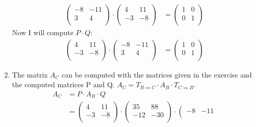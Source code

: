 \documentclass[a4paper]{article}
\begin{document}
\begin{enumerate}
\begin{align*}
  \left(
  \begin{array}{cc}
  -8 & -11 \\
  3 & 4 \\
  \end{array}
  \right)
  \cdot
  \left(
  \begin{array}{cc}
  4 & 11 \\
  -3 & -8 \\
  \end{array}
  \right)
  &=
  \left(
  \begin{array}{cc}
  1 & 0 \\
  0 & 1 \\
  \end{array}
  \right)
  \end{align*}
  Now I will compute $P \cdot Q$:
  \begin{align*}
  \left(
  \begin{array}{cc}
  4 & 11 \\
  -3 & -8 \\
  \end{array}
  \right)
  \cdot
  \left(
  \begin{array}{cc}
  -8 & -11 \\
  3 & 4 \\
  \end{array}
  \right)
  &=
  \left(
  \begin{array}{cc}
  1 & 0 \\
  0 & 1 \\
  \end{array}
  \right)
  \end{align*}
  \item The matrix $A_C$ can be computed with the matrices given in the exercise and the computed matrices P and Q. $A_C = T_{B \Rightarrow C} \cdot A_B \cdot T_{C \Rightarrow B}$.
  \begin{align*}
  A_C &= P \cdot A_B \cdot Q \\
  &=
  \left(
  \begin{array}{cc}
  4 & 11 \\
  -3 & -8 \\
  \end{array}
  \right)
  \cdot
  \left(
  \begin{array}{cc}
  35 & 88 \\
  -12 & -30 \\
  \end{array}
  \right)
  \cdot
  \left(
  \begin{array}{cc}
  -8 & -11 \\

\end{array}
\end{align*}
\end{enumerate}
\end{document}

